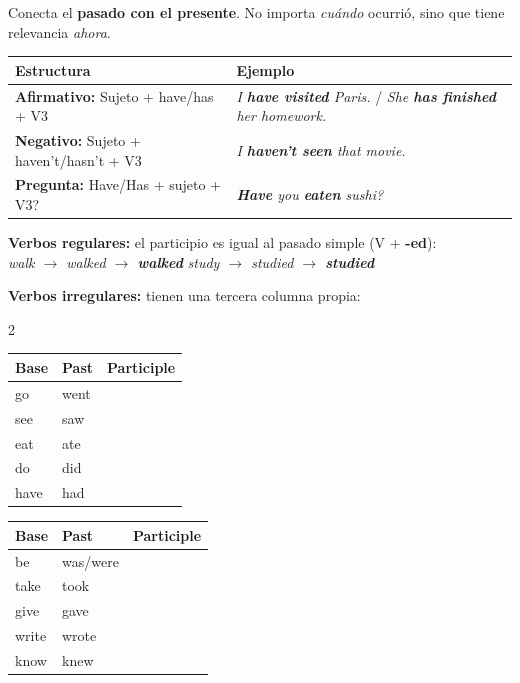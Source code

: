 \documentclass[12pt,a4paper]{article}
\begin{document}
\begin{cajagrammar}
Conecta el \textbf{pasado con el presente}. No importa \textit{cuándo} ocurrió, sino que tiene relevancia \textit{ahora}.

\medskip
\begin{tabularx}{\textwidth}{@{} l X @{}}
\toprule
\textbf{Estructura} & \textbf{Ejemplo} \\
\midrule
\textbf{Afirmativo:} Sujeto + have/has + V3 & \textit{I \textbf{have visited} Paris.} / \textit{She \textbf{has finished} her homework.} \\
\textbf{Negativo:} Sujeto + haven't/hasn't + V3 & \textit{I \textbf{haven't seen} that movie.} \\
\textbf{Pregunta:} Have/Has + sujeto + V3? & \textit{\textbf{Have} you \textbf{eaten} sushi?} \\
\bottomrule
\end{tabularx}

\medskip
\begin{cajaejemplo}
\textbf{Verbos regulares:} el participio es igual al pasado simple (V + \textbf{-ed}):\\
\textit{walk $\rightarrow$ walked $\rightarrow$ \textbf{walked}} \quad \textit{study $\rightarrow$ studied $\rightarrow$ \textbf{studied}}

\medskip
\textbf{Verbos irregulares:} tienen una tercera columna propia:

\begin{multicols}{2}
\begin{tabularx}{\linewidth}{@{} l l l @{}}
Base & Past & \textbf{Participle} \\
\midrule
go & went & \eng{gone} \\
see & saw & \eng{seen} \\
eat & ate & \eng{eaten} \\
do & did & \eng{done} \\
have & had & \eng{had} \\
\end{tabularx}

\columnbreak

\begin{tabularx}{\linewidth}{@{} l l l @{}}
Base & Past & \textbf{Participle} \\
\midrule
be & was/were & \eng{been} \\
take & took & \eng{taken} \\
give & gave & \eng{given} \\
write & wrote & \eng{written} \\
know & knew & \eng{known} \\
\end{tabularx}
\end{multicols}
\end{cajaejemplo}
\end{cajagrammar}
\end{document}
